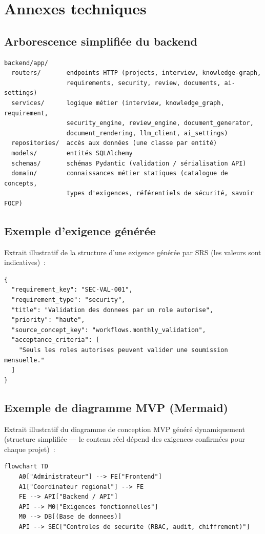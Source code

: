 \chapter{Annexes techniques}

\section{Arborescence simplifiée du backend}
\begin{lstlisting}
backend/app/
  routers/       endpoints HTTP (projects, interview, knowledge-graph,
                 requirements, security, review, documents, ai-settings)
  services/      logique métier (interview, knowledge_graph, requirement,
                 security_engine, review_engine, document_generator,
                 document_rendering, llm_client, ai_settings)
  repositories/  accès aux données (une classe par entité)
  models/        entités SQLAlchemy
  schemas/       schémas Pydantic (validation / sérialisation API)
  domain/        connaissances métier statiques (catalogue de concepts,
                 types d'exigences, référentiels de sécurité, savoir FOCP)
\end{lstlisting}

\section{Exemple d'exigence générée}
Extrait illustratif de la structure d'une exigence générée par SRS (les valeurs sont
indicatives)~:

\begin{lstlisting}
{
  "requirement_key": "SEC-VAL-001",
  "requirement_type": "security",
  "title": "Validation des donnees par un role autorise",
  "priority": "haute",
  "source_concept_key": "workflows.monthly_validation",
  "acceptance_criteria": [
    "Seuls les roles autorises peuvent valider une soumission mensuelle."
  ]
}
\end{lstlisting}

\section{Exemple de diagramme MVP (Mermaid)}
Extrait illustratif du diagramme de conception MVP généré dynamiquement (structure
simplifiée — le contenu réel dépend des exigences confirmées pour chaque projet)~:

\begin{lstlisting}
flowchart TD
    A0["Administrateur"] --> FE["Frontend"]
    A1["Coordinateur regional"] --> FE
    FE --> API["Backend / API"]
    API --> M0["Exigences fonctionnelles"]
    M0 --> DB[(Base de donnees)]
    API --> SEC["Controles de securite (RBAC, audit, chiffrement)"]
\end{lstlisting}

